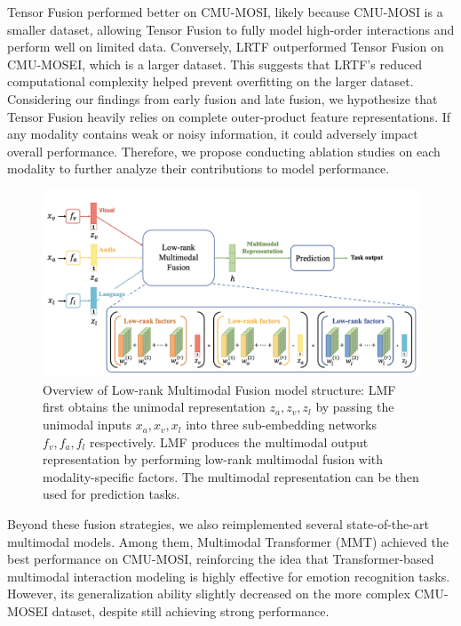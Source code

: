 \documentclass{article}
\begin{document}
Tensor Fusion performed better on CMU-MOSI, likely because CMU-MOSI is a smaller dataset, allowing Tensor Fusion to fully model high-order interactions and perform well on limited data. Conversely, LRTF outperformed Tensor Fusion on CMU-MOSEI, which is a larger dataset. This suggests that LRTF’s reduced computational complexity helped prevent overfitting on the larger dataset. Considering our findings from early fusion and late fusion, we hypothesize that Tensor Fusion heavily relies on complete outer-product feature representations. If any modality contains weak or noisy information, it could adversely impact overall performance. Therefore, we propose conducting ablation studies on each modality to further analyze their contributions to model performance.

\begin{figure}[h]
    \centering
    \includegraphics[width=1\linewidth]{figs/LRTF.png}
    \caption{Overview of Low-rank Multimodal Fusion model structure: LMF first obtains the unimodal representation $z_a, z_v, z_l$ by passing the unimodal inputs $x_a, x_v, x_l$ into three sub-embedding networks $f_v, f_a, f_l$ respectively. LMF produces the multimodal output representation by performing low-rank multimodal fusion with modality-specific factors. The multimodal representation can be then used for prediction tasks. \cite{Liu2018EfficientLM} }
    
    \label{fig:LRTF}
\end{figure}

Beyond these fusion strategies, we also reimplemented several state-of-the-art multimodal models. Among them, Multimodal Transformer (MMT) achieved the best performance on CMU-MOSI, reinforcing the idea that Transformer-based multimodal interaction modeling is highly effective for emotion recognition tasks. However, its generalization ability slightly decreased on the more complex CMU-MOSEI dataset, despite still achieving strong performance. 
\end{document}
